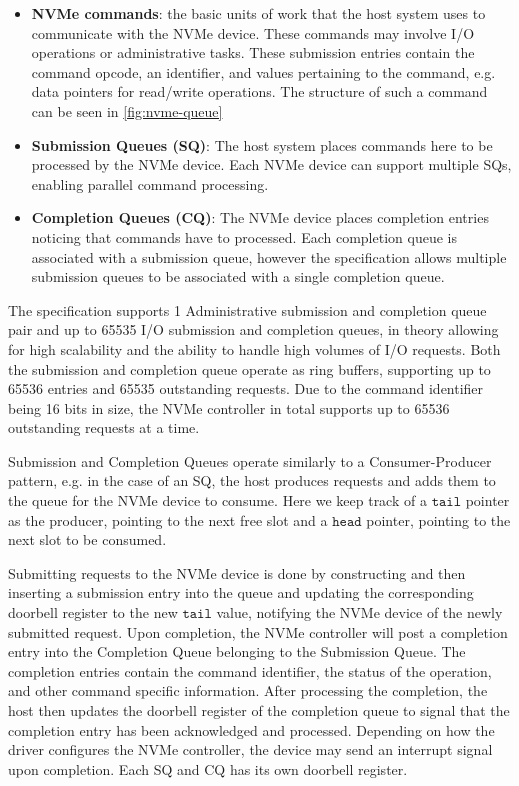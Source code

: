 \begin{itemize}
    \item \textbf{NVMe commands}: the basic units of work that the host system uses to communicate with the NVMe device. These commands may involve I/O operations or administrative tasks. These submission entries contain the command opcode, an identifier, and values pertaining to the command, e.g. data pointers for read/write operations. The structure of such a command can be seen in \autoref{fig:nvme-queue}
    \item \textbf{Submission Queues (SQ)}: The host system places commands here to be processed by the NVMe device. Each NVMe device can support multiple SQs, enabling parallel command processing.
    \item \textbf{Completion Queues (CQ)}: The NVMe device places completion entries noticing that commands have to processed. Each completion queue is associated with a submission queue, however the specification allows multiple submission queues to be associated with a single completion queue.
\end{itemize}

The specification supports 1 Administrative submission and completion queue pair and up to 65535 I/O submission and completion queues, in theory allowing for high scalability and the ability to handle high volumes of I/O requests. Both the submission and completion queue operate as ring buffers, supporting up to 65536 entries and 65535 outstanding requests. Due to the command identifier being 16 bits in size, the NVMe controller in total supports up to 65536 outstanding requests at a time.

Submission and Completion Queues operate similarly to a Consumer-Producer pattern, e.g. in the case of an SQ, the host produces requests and adds them to the queue for the NVMe device to consume. Here we keep track of a $\texttt{tail}$ pointer as the producer, pointing to the next free slot and a $\texttt{head}$ pointer, pointing to the next slot to be consumed.

Submitting requests to the NVMe device is done by constructing and then inserting a submission entry into the queue and updating the corresponding doorbell register to the new $\texttt{tail}$ value, notifying the NVMe device of the newly submitted request. Upon completion, the NVMe controller will post a completion entry into the Completion Queue belonging to the Submission Queue. The completion entries contain the command identifier, the status of the operation, and other command specific information. After processing the completion, the host then updates the doorbell register of the completion queue to signal that the completion entry has been acknowledged and processed. Depending on how the driver configures the NVMe controller, the device may send an interrupt signal upon completion. Each SQ and CQ has its own doorbell register.

